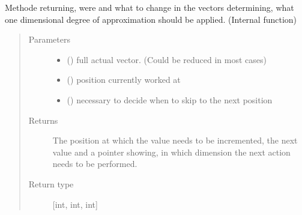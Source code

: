 \documentclass[letterpaper,10pt,english]{sphinxmanual}
\begin{document}
\begin{fulllineitems}
\label{\detokenize{index:Studienprojekt_Smolyak_qmc_one_point.next_step}}
Methode returning, were and what to change in the vectors determining, what one dimensional degree of
approximation should be applied. (Internal function)
\begin{quote}\begin{description}
\item[{Parameters}] \leavevmode\begin{itemize}
\item {} 
 () \textendash{} full actual vector. (Could be reduced in most cases)

\item {} 
 () \textendash{} position currently worked at

\item {} 
 () \textendash{} necessary to decide when to skip to the next position

\end{itemize}

\item[{Returns}] \leavevmode
The position at which the value needs to be incremented, the next value and a pointer showing,
in which dimension the next action needs to be performed.

\item[{Return type}] \leavevmode
{[}int, int, int{]}

\end{description}\end{quote}

\end{fulllineitems}

\end{document}
